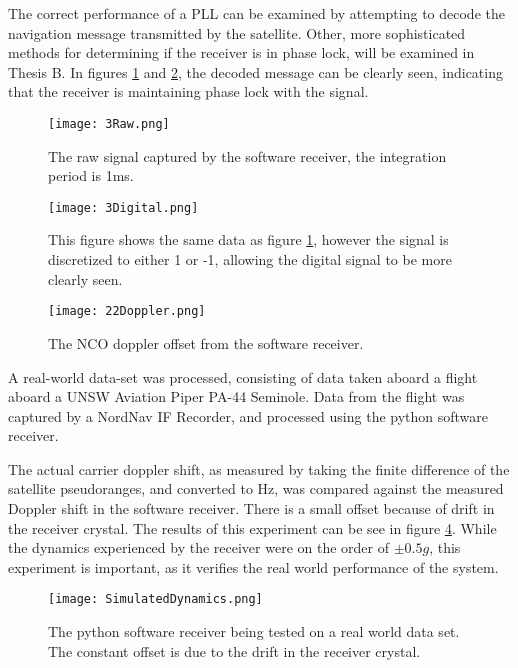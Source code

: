 The correct performance of a \ac{PLL} can be examined by attempting to decode the navigation message transmitted by the satellite. Other, more sophisticated methods for determining if the receiver is in phase lock, will be examined in Thesis B. In figures \ref{fig:RawSignal} and \ref{fig:DigitalSignal}, the decoded message can be clearly seen, indicating that the receiver is maintaining phase lock with the signal.

\begin{figure}[!htb] 
    \centering
    \texttt{[image: 3Raw.png]} 
    \caption{The raw signal captured by the software receiver, the integration period is 1ms.}
    \label{fig:RawSignal}
\end{figure}


\begin{figure}[!htb] 
    \centering
    \texttt{[image: 3Digital.png]} 
    \caption{This figure shows the same data as figure \ref{fig:RawSignal}, however the signal is discretized to either 1 or -1, allowing the digital signal to be more clearly seen.}
    \label{fig:DigitalSignal}
\end{figure}


\begin{figure}[!htb] 
    \centering
    \texttt{[image: 22Doppler.png]} 
    \caption{The \ac{NCO} doppler offset from the software receiver.}
    \label{fig:Doppler}
\end{figure}


A real-world data-set was processed, consisting of data taken aboard a flight aboard a UNSW Aviation Piper PA-44 Seminole. Data from the flight was captured by a NordNav IF Recorder, and processed using the python software receiver. 

The actual carrier doppler shift, as measured by taking the finite difference of the satellite pseudoranges, and converted to Hz, was compared against the measured Doppler shift in the software receiver. There is a small offset because of drift in the receiver crystal. The results of this experiment can be see in figure \ref{fig:SimulatedDynamics}. While the dynamics experienced by the receiver were on the order of $\pm 0.5g$, this experiment is important, as it verifies the real world performance of the system. 

\begin{figure}[!htb] 
    \centering
    \texttt{[image: SimulatedDynamics.png]} 
    \caption{The python software receiver being tested on a real world data set. The constant offset is due to the drift in the receiver crystal.}
    \label{fig:SimulatedDynamics}
\end{figure}


